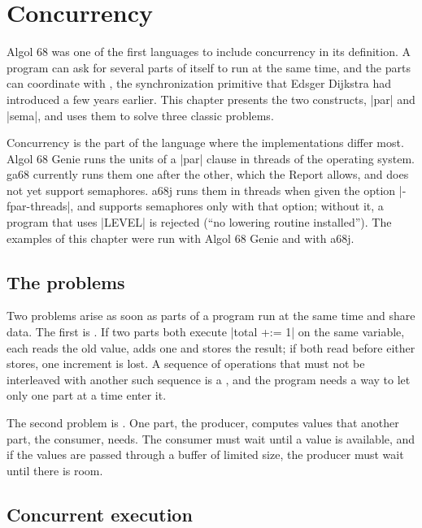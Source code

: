 \chapter{Concurrency}\label{ch-par}

Algol 68 was one of the first languages to include concurrency in its
definition. A program can ask for several parts of itself to run at the
same time, and the parts can coordinate with , the
synchronization primitive that Edsger Dijkstra had introduced a few years
earlier. This chapter presents the two constructs, \code|par| and
\code|sema|, and uses them to solve three classic problems.

\begin{implnote}
Concurrency is the part of the language where the implementations differ
most. Algol 68 Genie runs the units of a \code|par| clause in threads of
the operating system. ga68 currently runs them one after the other, which
the Report allows, and does not yet support semaphores. a68j runs them in
threads when given the option \code|-fpar-threads|, and supports
semaphores only with that option; without it, a program that uses
\code|LEVEL| is rejected (``no lowering routine installed''). The
examples of this chapter were run with Algol 68 Genie and with a68j.
\end{implnote}

\section{The problems}\label{sec-par-problems}

Two problems arise as soon as parts of a program run at the same time and
share data. The first is . If two parts both
execute \code|total +:= 1| on the same variable, each reads the old
value, adds one and stores the result; if both read before either stores,
one increment is lost. A sequence of operations that must not be
interleaved with another such sequence is a , and
the program needs a way to let only one part at a time enter it.

The second problem is . One part, the producer,
computes values that another part, the consumer, needs. The consumer must
wait until a value is available, and if the values are passed through a
buffer of limited size, the producer must wait until there is room.

\section{Concurrent execution}\label{sec-par}

